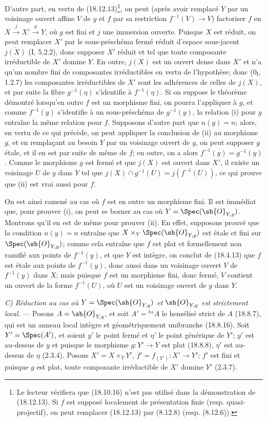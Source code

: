 D'autre part, en vertu de (18.12.13)\footnote{Le lecteur vérifiera que (18.10.16) n'est pas utilisé dans la démonstration de (18.12.13). Si $f$ est supposé localement de présentation finie (resp. quasi-projectif), on peut remplacer (18.12.13) par (8.12.8) (resp. (8.12.6)).}, on peut (après avoir remplacé $Y$ par un voisinage ouvert affine $V$ de $y$ et $f$ par sa restriction $f^{-1}(V)\to V$) factoriser $f$ en $X\xrightarrow{j}X'\xrightarrow{g}Y$, où $g$ est fini et $j$ une immersion ouverte. Puisque $X$ est réduit, on peut remplacer $X'$ par le sous-préschéma fermé réduit d'espace sous-jacent $\overline{j(X)}$ (I, 5.2.2), donc supposer $X'$ réduit et tel que toute composante irréductible de $X'$ domine $Y$. En outre, $j(X)$ est un ouvert dense dans $X'$ et n'a qu'un nombre fini de composantes irréductibles en vertu de l'hypothèse; donc ($0_{\mathrm I}$, 1.2.7) les composantes irréductibles de $X'$ sont les adhérences de celles de $j(X)$, et par suite la fibre $g^{-1}(\eta)$ s'identifie à $f^{-1}(\eta)$. Si on suppose le théorème démontré lorsqu'en outre $f$ est un morphisme fini, on pourra l'appliquer à $g$, et comme $f^{-1}(y)$ s'identifie à un sous-préschéma de $g^{-1}(y)$, la relation (i) pour $g$ entraîne la même relation pour $f$. Supposons d'autre part que $n(y)=n$; alors, en vertu de ce qui précède, on peut appliquer la conclusion de (ii) au morphisme $g$, et en remplaçant au besoin $Y$ par un voisinage ouvert de $y$, on peut supposer $g$ étale, et il en est par suite de même de $f$; en outre, on a alors $f^{-1}(y)=g^{-1}(y)$. Comme le morphisme $g$ est fermé et que $j(X)$ est ouvert dans $X'$, il existe un voisinage $U$ de $y$ dans $Y$ tel que $j(X)\cap g^{-1}(U)=j(f^{-1}(U))$, ce qui prouve que (ii) est vrai aussi pour $f$.

On est ainsi ramené au cas où $f$ est en outre un morphisme fini. Il est immédiat que, pour prouver (i), on peut se borner au cas où $Y=\Spec(\sh{O}_{Y,y})$. Montrons qu'il en est de même pour prouver (ii). En effet, supposons prouvé que la condition $n(y)=n$ entraîne que $X\times_Y\Spec(\sh{O}_{Y,y})$ est étale et fini sur $\Spec(\sh{O}_{Y,y})$; comme cela entraîne que $f$ est plat et formellement non ramifié aux points de $f^{-1}(y)$, et que $Y$ est intègre, on conclut de (18.4.13) que $f$ est étale aux points de $f^{-1}(y)$, donc aussi dans un voisinage ouvert $V$ de $f^{-1}(y)$ dans $X$; mais puisque $f$ est un morphisme fini, donc fermé, $V$ contient un ouvert de la forme $f^{-1}(U)$, où $U$ est un voisinage ouvert de $y$ dans $Y$.

\emph{C) Réduction au cas où $Y=\Spec(\sh{O}_{Y,y})$ et $\sh{O}_{Y,y}$ est strictement local.} --- Posons $A=\sh{O}_{Y,y}$, et soit $A'={}^{hs}\!A$ le hensélisé strict de $A$ (18.8.7), qui est un anneau local intègre et géométriquement unibranche (18.8.16). Soit $Y'=\Spec(A')$, et soient $y'$ le point fermé et $\eta'$ le point générique de $Y'$; $y'$ est au-dessus de $y$ et puisque le morphisme $g:Y'\to Y$ est plat (18.8.8), $\eta'$ est au-dessus de $\eta$ (2.3.4). Posons $X'=X\times_Y Y'$, $f'=f_{(Y')}:X'\to Y'$; $f'$ est fini et puisque $g$ est plat, toute composante irréductible de $X'$ domine $Y'$ (2.3.7).

